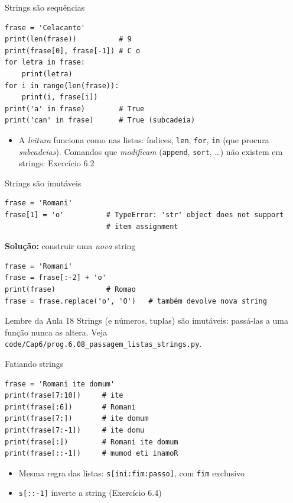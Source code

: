 \documentclass[aspectratio=169,10pt,t]{beamer}
\begin{document}
\begin{frame}[fragile]{Strings são sequências}
\begin{lstlisting}
frase = 'Celacanto'
print(len(frase))          # 9
print(frase[0], frase[-1]) # C o
for letra in frase:
    print(letra)
for i in range(len(frase)):
    print(i, frase[i])
print('a' in frase)        # True
print('can' in frase)      # True (subcadeia)
\end{lstlisting}
  \begin{itemize}
    \item A \emph{leitura} funciona como nas listas: índices, \texttt{len}, \texttt{for}, \texttt{in} (que procura \emph{subcadeias}). Comandos que \emph{modificam} (\texttt{append}, \texttt{sort}, \ldots) não existem em strings: Exercício 6.2
  \end{itemize}
\end{frame}

\begin{frame}[fragile]{Strings são imutáveis}
\begin{lstlisting}
frase = 'Romani'
frase[1] = 'o'          # TypeError: 'str' object does not support
                        # item assignment
\end{lstlisting}
  \textbf{Solução:} construir uma \emph{nova} string
\begin{lstlisting}
frase = 'Romani'
frase = frase[:-2] + 'o'
print(frase)            # Romao
frase = frase.replace('o', 'O')   # também devolve nova string
\end{lstlisting}
  \begin{alertblock}{Lembre da Aula 18}
    Strings (e números, tuplas) são imutáveis: passá-las a uma função nunca as altera. Veja \texttt{code/Cap6/prog.6.08\_passagem\_listas\_strings.py}.
  \end{alertblock}
\end{frame}

\begin{frame}[fragile]{Fatiando strings}
\begin{lstlisting}
frase = 'Romani ite domum'
print(frase[7:10])     # ite
print(frase[:6])       # Romani
print(frase[7:])       # ite domum
print(frase[7:-1])     # ite domu
print(frase[:])        # Romani ite domum
print(frase[::-1])     # mumod eti inamoR
\end{lstlisting}
  \begin{itemize}
    \item Mesma regra das listas: \texttt{s[ini:fim:passo]}, com \texttt{fim} exclusivo
    \item \texttt{s[::-1]} inverte a string (Exercício 6.4)
  \end{itemize}
\end{frame}
\end{document}
